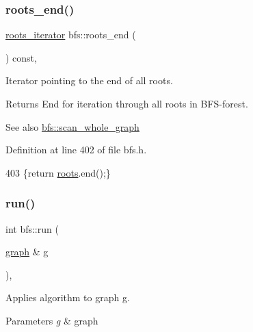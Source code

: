 \subsubsection{\texorpdfstring{roots\+\_\+end()}{roots\_end()}}
{\footnotesize\ttfamily \mbox{\hyperlink{classbfs_a70b915179053a2993154614d4358fdc1}{roots\+\_\+iterator}} bfs\+::roots\+\_\+end (\begin{DoxyParamCaption}{ }\end{DoxyParamCaption}) const\hspace{0.3cm}{\ttfamily [inline]}, {\ttfamily [inherited]}}



Iterator pointing to the end of all roots. 

\begin{DoxyReturn}{Returns}
End for iteration through all roots in B\+F\+S-\/forest. 
\end{DoxyReturn}
\begin{DoxySeeAlso}{See also}
\mbox{\hyperlink{classbfs_a25fc51b1bfbbdd3afefe0a84c1bd2f6b}{bfs\+::scan\+\_\+whole\+\_\+graph}} 
\end{DoxySeeAlso}


Definition at line 402 of file bfs.\+h.


\begin{DoxyCode}
403     \{\textcolor{keywordflow}{return} \mbox{\hyperlink{classbfs_acea071a6fdad8e590b40830ced241824}{roots}}.end();\}
\end{DoxyCode}
\mbox{\label{classbfs_a06ae16bd0f3bb2f8eb6b3e36659ba82e}} 
\subsubsection{\texorpdfstring{run()}{run()}}
{\footnotesize\ttfamily int bfs\+::run (\begin{DoxyParamCaption}\item[{\mbox{\hyperlink{classgraph}{graph}} \&}]{g }\end{DoxyParamCaption})\hspace{0.3cm}{\ttfamily [virtual]}, {\ttfamily [inherited]}}



Applies algorithm to graph g. 


\begin{DoxyParams}{Parameters}
{\em g} & graph \\
\hline
\end{DoxyParams}

